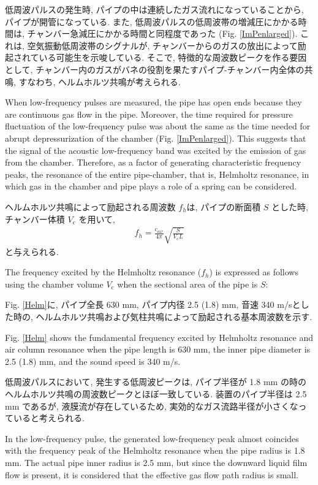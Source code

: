 \documentclass[12pt]{article}
\begin{document}
低周波パルスの発生時, パイプの中は連続したガス流れになっていることから, パイプが開管になっている.
また, 低周波パルスの低周波帯の増減圧にかかる時間は, チャンバー急減圧にかかる時間と同程度であった (Fig. \ref{ImPenlarged}). 
これは, 空気振動低周波帯のシグナルが, チャンバーからのガスの放出によって励起されている可能生を示唆している. 
そこで, 特徴的な周波数ピークを作る要因として, チャンバー内のガスがバネの役割を果たすパイプ-チャンバー内全体の共鳴, すなわち, ヘルムホルツ共鳴が考えられる.

When low-frequency pulses are measured, the pipe has open ends because they are continuous gas flow in the pipe.
Moreover, the time required for pressure fluctuation of the low-frequency pulse was about the same as the time needed for abrupt depressurization of the chamber (Fig. \ref{ImPenlarged}).
This suggests that the signal of the acoustic low-frequency band was excited by the emission of gas from the chamber.
Therefore, as a factor of generating characteristic frequency peaks, the resonance of the entire pipe-chamber, that is, Helmholtz resonance, in which gas in the chamber and pipe plays a role of a spring can be considered.


ヘルムホルツ共鳴によって励起される周波数 $f_h$は, パイプの断面積 $S$ とした時, チャンバー体積 $V_\mathrm{c}$ を用いて,  
\begin{eqnarray}
f_{h}=\frac{c_{air}}{4\pi} \sqrt{  \frac{S}{V_\mathrm{c} L }   } \label{Helmeq}
\end{eqnarray}
と与えられる. 

The frequency excited by the Helmholtz resonance ($f_h$) is expressed as follows using the chamber volume $V_\mathrm{c}$ when the sectional area of ​​the pipe is $S$:

Fig. \ref{Helm}に, パイプ全長 630 mm, パイプ内径 2.5 (1.8) mm, 音速 340 m/sとした時の, ヘルムホルツ共鳴および気柱共鳴によって励起される基本周波数を示す. 

Fig. \ref{Helm} shows the fundamental frequency excited by Helmholtz resonance and air column resonance when the pipe length is 630 mm, the inner pipe diameter is 2.5 (1.8) mm, and the sound speed is 340 m/s.

低周波パルスにおいて, 発生する低周波ピークは, パイプ半径が 1.8 mm の時のヘルムホルツ共鳴の周波数ピークとほぼ一致している. 
装置のパイプ半径は 2.5 mm であるが, 液膜流が存在しているため, 実効的なガス流路半径が小さくなっていると考えられる. 

In the low-frequency pulse, the generated low-frequency peak almost coincides with the frequency peak of the Helmholtz resonance when the pipe radius is 1.8 mm.
The actual pipe inner radius is 2.5 mm, but since the downward liquid film flow is present, it is considered that the effective gas flow path radius is small.
\end{document}
